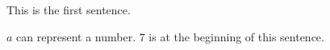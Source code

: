 This is the first
sentence. 

$a$ can 
represent a 
number. 7 is
at the beginning of this sentence.
